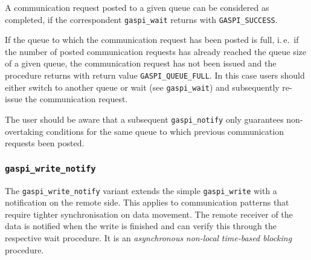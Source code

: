 \documentclass[a4paper]{article}
\newlength{\st}\setlength{\st}{0pt}
\newcommand{\zsep}[1]{#1}
\newcommand{\gaspiprefix}{gaspi}
\newcommand{\function}[1]{{\tt #1}}
\newcommand{\gaspifunction}[1]{\function{\protect\zsep{\gaspiprefix\_#1}}}
\newcommand{\GASPISUCC}{{\tt\protect\zsep{GASPI\_SUCCESS}}}
\newcommand{\GASPIQUEUE}{{\tt\protect\zsep{GASPI\_QUEUE\_FULL}}}
\newcommand{\gaspisemantic}[1]{{\emph{#1}}}
\begin{document}
A communication request posted to a given queue can be considered as completed, if the
correspondent \gaspifunction{wait} returns with \GASPISUCC{}. 

If the queue to which the communication request has been posted is full, i.\,e.\ if the number of
posted communication requests has already reached the queue size of a given queue, the communication
request has not been issued and the procedure returns with return value \GASPIQUEUE{}.
In this case users should either switch to another queue or wait (see \gaspifunction{wait}) and subsequently re-issue the communication request.

The user should be aware that a subsequent \gaspifunction{notify} only guarantees non-overtaking conditions for the same queue to
which previous communication requests been posted.

\subsubsection{\gaspifunction{write\_notify}}

The \gaspifunction{write\_notify} variant extends the simple
\gaspifunction{write} with a notification on the remote
side. This applies to communication patterns that require tighter
synchronisation on data movement. The remote receiver of the data is
notified when the write is finished and can verify this through the
respective wait procedure. It is an \gaspisemantic{asynchronous}
\gaspisemantic{non-local} \gaspisemantic{time-based blocking}
procedure.
\end{document}

